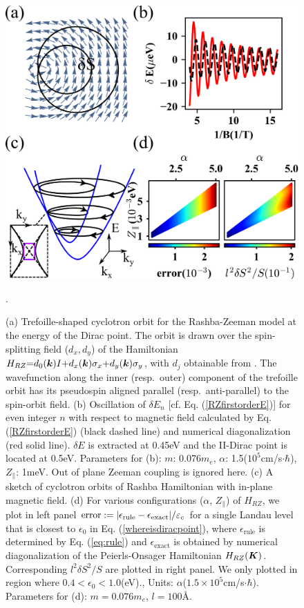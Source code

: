 \documentclass[aps, prb, showpacs, twocolumn, notitlepage, superscriptaddress]{revtex4-1}
\begin{document}
\begin{figure}
\includegraphics[width=1.0\columnwidth]{RZ.png}
\caption{(a) Trefoille-shaped cyclotron orbit for the Rashba-Zeeman model at the energy of the Dirac point. The orbit is drawn over the  spin-splitting field ($d_x,d_y$) of the Hamiltonian $H_{RZ}{=}d_0(\boldsymbol{k})I{+}d_x(\boldsymbol{k})\sigma_x{+}d_y(\boldsymbol{k})\sigma_y$, with $d_j$ obtainable from . The wavefunction along the inner (resp.\ outer) component of the trefoille orbit has its pseudospin aligned parallel (resp.\ anti-parallel) to the spin-orbit field. (b) Oscillation of $\delta E_n$ [cf. Eq. (\ref{RZfirstorderE})] for even integer $n$ with respect to magnetic field calculated by Eq. (\ref{RZfirstorderE}) (black dashed line) and numerical diagonalization (red solid line). $\delta E$ is extracted at 0.45eV and the II-Dirac point is located at 0.5eV. Parameters for (b): $m$: 0.076$m_e$, $\alpha$: 1.5($10^{5}$cm/s$\cdot\hbar$), $Z_\parallel$: 1meV. Out of plane Zeeman coupling is ignored here. (c) A sketch of cyclotron orbits of Rashba Hamiltonian with in-plane magnetic field. (d) For various configurations ($\alpha$, $Z_\parallel$) of $H_{RZ}$, we plot in left panel $\text{error}:=|\epsilon_\text{rule}-\epsilon_\text{exact}|/\varepsilon_c$ for a single Landau level that is closest to $\epsilon_0$ in Eq. (\ref{whereisdiracpoint}), where $\epsilon_\text{rule}$ is determined by Eq. (\ref{eq:rule}) and $\epsilon_{\text{exact}}$ is obtained by numerical diagonalization of the Peierls-Onsager Hamiltonian $H_{RZ}(\boldsymbol{K})$. Corresponding $l^2 \delta S^2/S$ are plotted in right panel. We only plotted in region where $0.4<\epsilon_0<1.0$(eV).\cite{RZfignote}, Units: $\alpha$($1.5\times 10^{5}$cm/s$\cdot\hbar$). Parameters for (d): $m=0.076m_e$, $l=100$\AA. \label{fig:RZ}}.
\end{figure}
\end{document}
